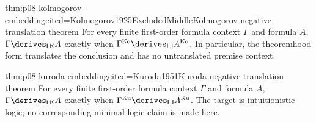 \begin{hbtheorem}{thm:p08-kolmogorov-embedding}{cited=Kolmogorov1925ExcludedMiddle}{Kolmogorov negative-translation theorem}
For every finite first-order formula context \(\Gamma\) and formula \(A\),
\(\Gamma\derives_{\mathsf{LK}}A\) exactly when
\(\Gamma^{\mathrm{Ko}}\derives_{\mathsf{LJ}}A^{\mathrm{Ko}}\).
In particular, the theoremhood form translates the conclusion and has no
untranslated premise context.
\end{hbtheorem}

\begin{hbtheorem}{thm:p08-kuroda-embedding}{cited=Kuroda1951}{Kuroda negative-translation theorem}
For every finite first-order formula context \(\Gamma\) and formula \(A\),
\(\Gamma\derives_{\mathsf{LK}}A\) exactly when
\(\Gamma^{\mathrm{Ku}}\derives_{\mathsf{LJ}}A^{\mathrm{Ku}}\).
The target is intuitionistic logic; no corresponding minimal-logic claim is
made here.
\end{hbtheorem}

